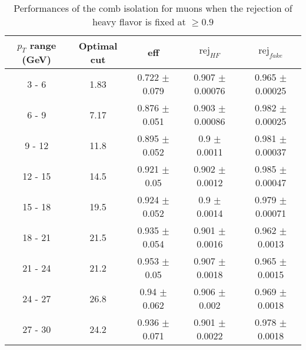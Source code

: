 \begin{table}[htbp]
   \centering
   \begin{tabular}{|c|c|c|c|c|}
      \hline
      $p_T$ range (GeV) & Optimal cut & eff & $\textrm{rej}_{HF}$ & $\textrm{rej}_{fake}$ \\
      \hline
      3 - 6 & 1.83 & 0.722 $\pm$ 0.079 & 0.907 $\pm$ 0.00076 & 0.965 $\pm$ 0.00025 \\
      \hline
      6 - 9 & 7.17 & 0.876 $\pm$ 0.051 & 0.903 $\pm$ 0.00086 & 0.982 $\pm$ 0.00025 \\
      \hline
      9 - 12 & 11.8 & 0.895 $\pm$ 0.052 & 0.9 $\pm$ 0.0011 & 0.981 $\pm$ 0.00037 \\
      \hline
      12 - 15 & 14.5 & 0.921 $\pm$ 0.05 & 0.902 $\pm$ 0.0012 & 0.985 $\pm$ 0.00047 \\
      \hline
      15 - 18 & 19.5 & 0.924 $\pm$ 0.052 & 0.9 $\pm$ 0.0014 & 0.979 $\pm$ 0.00071 \\
      \hline
      18 - 21 & 21.5 & 0.935 $\pm$ 0.054 & 0.901 $\pm$ 0.0016 & 0.962 $\pm$ 0.0013 \\
      \hline
      21 - 24 & 21.2 & 0.953 $\pm$ 0.05 & 0.907 $\pm$ 0.0018 & 0.965 $\pm$ 0.0015 \\
      \hline
      24 - 27 & 26.8 & 0.94 $\pm$ 0.062 & 0.906 $\pm$ 0.002 & 0.969 $\pm$ 0.0018 \\
      \hline
      27 - 30 & 24.2 & 0.936 $\pm$ 0.071 & 0.901 $\pm$ 0.0022 & 0.978 $\pm$ 0.0018 \\
      \hline
   \end{tabular}
   \caption{\small{Performances of the comb isolation for muons when the rejection of heavy flavor is fixed at $\geq 0.9$}\label{tab:comb_muon_pureHf}}
\end{table}






